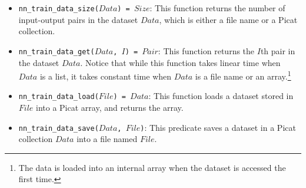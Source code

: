 \begin{itemize}
\item \texttt{nn\_train\_data\_size($Data$) = $Size$}: This function returns the number of input-output pairs in the dataset $Data$, which is either a file name or a Picat collection.

\item \texttt{nn\_train\_data\_get($Data$, $I$) = $Pair$}: This function returns the $I$th pair in the dataset $Data$. Notice that while this function takes linear time when $Data$ is a list, it takes constant time when $Data$ is a file name or an array.\footnote{The data is loaded into an internal array when the dataset is accessed the first time.}

\item \texttt{nn\_train\_data\_load($File$) = $Data$}: This function loads a dataset stored in $File$ into a Picat array, and returns the array.

\item \texttt{nn\_train\_data\_save($Data$, $File$)}: This predicate saves a dataset in a Picat collection $Data$ into a file named $File$.
\end{itemize}

